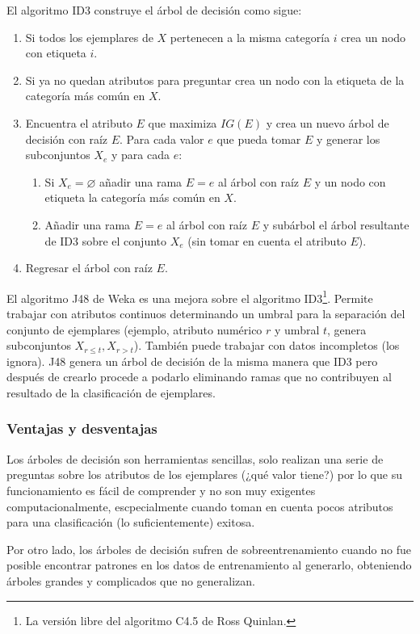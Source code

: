 \documentclass[spanish,11pt,letterpaper]{article}
\begin{document}
El algoritmo ID3 construye el árbol de decisión como sigue:
\begin{enumerate}
  \item Si todos los ejemplares de $X$ pertenecen a la misma categoría $i$ crea un nodo con etiqueta $i$.
  \item Si ya no quedan atributos para preguntar crea un nodo con la etiqueta de la categoría más común en $X$.
  \item Encuentra el atributo $E$ que maximiza $IG(E)$ y crea un nuevo árbol de decisión con raíz $E$. Para cada valor $e$ que pueda tomar $E$ y generar los subconjuntos $X_e$ y para cada $e$:
  \begin{enumerate}
    \item Si $X_e = \varnothing$ añadir una rama $E=e$ al árbol con raíz $E$ y un nodo con etiqueta la categoría más común en $X$.
    \item Añadir una rama $E=e$ al árbol con raíz $E$ y subárbol el árbol resultante de ID3 sobre el conjunto $X_e$ (sin tomar en cuenta el atributo $E$).
  \end{enumerate}
  \item Regresar el árbol con raíz $E$.
\end{enumerate}

El algoritmo J48 de Weka es una mejora sobre el algoritmo ID3\footnote{La versión libre del
algoritmo C4.5 de Ross Quinlan.}. Permite trabajar con atributos continuos determinando
un umbral para la separación del conjunto de ejemplares (ejemplo,
atributo numérico $r$ y umbral $t$, genera subconjuntos $X_{r\leq t},X_{r > t}$). También puede
trabajar con datos incompletos (los ignora). J48 genera un árbol de decisión de
la misma manera que ID3 pero después de crearlo procede a podarlo eliminando ramas
que no contribuyen al resultado de la clasificación de ejemplares.

\subsubsection{Ventajas y desventajas}

Los árboles de decisión son herramientas sencillas, solo realizan una serie de
preguntas sobre los atributos de los ejemplares (¿qué valor tiene?) por lo que
su funcionamiento es fácil de comprender y no son muy exigentes computacionalmente,
escpecialmente cuando toman en cuenta pocos atributos para una clasificación
(lo suficientemente) exitosa.

Por otro lado, los árboles de decisión sufren de sobreentrenamiento cuando no
fue posible encontrar patrones en los datos de entrenamiento al generarlo, obteniendo árboles
grandes y complicados que no generalizan.
\end{document}
